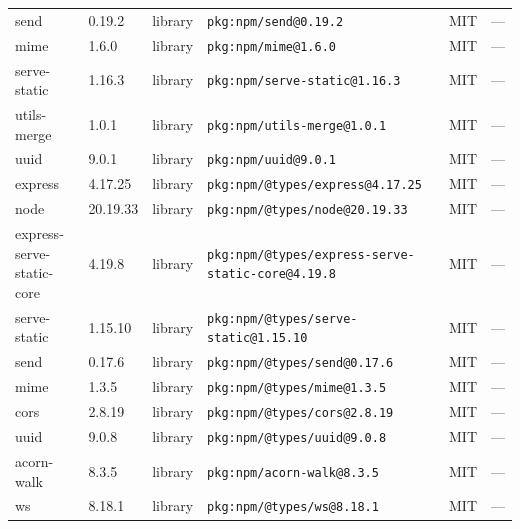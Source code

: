 \documentclass[11pt,a4paper]{article}
\begin{document}
\begin{longtable}{|p{4cm}|p{2cm}|p{1.6cm}|p{5cm}|p{1.5cm}|p{3.5cm}|}
\raggedright send & 0.19.2 & library & \small\texttt{pkg:npm/send@0.19.2} & MIT & \small — \\
\raggedright mime & 1.6.0 & library & \small\texttt{pkg:npm/mime@1.6.0} & MIT & \small — \\
\raggedright serve-static & 1.16.3 & library & \small\texttt{pkg:npm/serve-static@1.16.3} & MIT & \small — \\
\raggedright utils-merge & 1.0.1 & library & \small\texttt{pkg:npm/utils-merge@1.0.1} & MIT & \small — \\
\raggedright uuid & 9.0.1 & library & \small\texttt{pkg:npm/uuid@9.0.1} & MIT & \small — \\
\raggedright express & 4.17.25 & library & \small\texttt{pkg:npm/@types/express@4.17.25} & MIT & \small — \\
\raggedright node & 20.19.33 & library & \small\texttt{pkg:npm/@types/node@20.19.33} & MIT & \small — \\
\raggedright express-serve-static-core & 4.19.8 & library & \small\texttt{pkg:npm/@types/express-serve-static-core@4.19.8} & MIT & \small — \\
\raggedright serve-static & 1.15.10 & library & \small\texttt{pkg:npm/@types/serve-static@1.15.10} & MIT & \small — \\
\raggedright send & 0.17.6 & library & \small\texttt{pkg:npm/@types/send@0.17.6} & MIT & \small — \\
\raggedright mime & 1.3.5 & library & \small\texttt{pkg:npm/@types/mime@1.3.5} & MIT & \small — \\
\raggedright cors & 2.8.19 & library & \small\texttt{pkg:npm/@types/cors@2.8.19} & MIT & \small — \\
\raggedright uuid & 9.0.8 & library & \small\texttt{pkg:npm/@types/uuid@9.0.8} & MIT & \small — \\
\raggedright acorn-walk & 8.3.5 & library & \small\texttt{pkg:npm/acorn-walk@8.3.5} & MIT & \small — \\
\raggedright ws & 8.18.1 & library & \small\texttt{pkg:npm/@types/ws@8.18.1} & MIT & \small — \\
\end{longtable}
\end{document}
